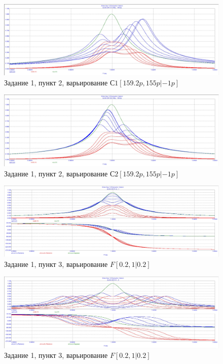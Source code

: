 \documentclass[a4paper, 14pt]{extarticle}%
\begin{document}
\begin{figure}[h!]
	\centering
			\includegraphics[width=1.1\linewidth]{1.2_varC1_3.jpg}
            \caption{Задание 1, пункт 2, варьирование $С1 [159.2p,155p|-1p]$}
	\label{A}
\end{figure}


\begin{figure}[h!]
	\centering
			\includegraphics[width=1.1\linewidth]{1.2_varC1_4.jpg}
            \caption{Задание 1, пункт 2, варьирование $С2 [159.2p,155p|-1p]$}
	\label{A}
\end{figure}

\begin{figure}[h!]
	\centering
			\includegraphics[width=1.1\linewidth]{1.2varF1.jpg}
            \caption{Задание 1, пункт 3, варьирование $F [0.2, 1|0.2]$}
	\label{A}
\end{figure}


\begin{figure}[h!]
	\centering
			\includegraphics[width=1.1\linewidth]{1.2varF2.jpg}
            \caption{Задание 1,  пункт 3, варьирование $F [0.2, 1|0.2]$}
	\label{A}
\end{figure}
\end{document}
